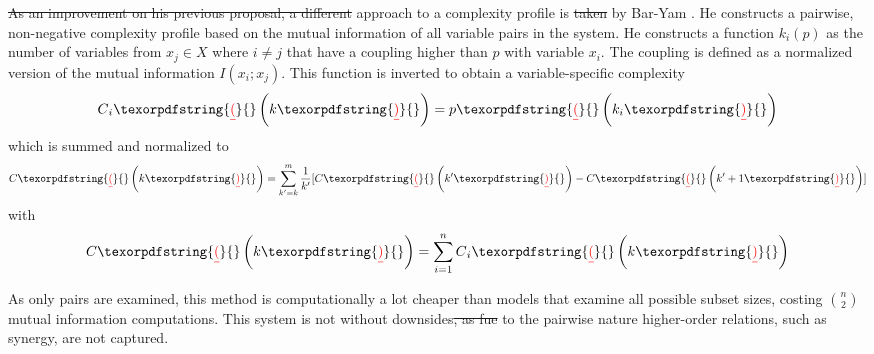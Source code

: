 \documentclass{article}
\providecommand{\DIFaddtex}[1]{{\protect\color{blue}\uwave{#1}}} %
\providecommand{\DIFdeltex}[1]{{\protect\color{red}\sout{#1}}}                      %
\providecommand{\DIFaddbegin}{} %
\providecommand{\DIFaddend}{} %
\providecommand{\DIFdelbegin}{} %
\providecommand{\DIFdelend}{} %
\providecommand{\DIFadd}[1]{\texorpdfstring{\DIFaddtex{#1}}{#1}} %
\providecommand{\DIFdel}[1]{\texorpdfstring{\DIFdeltex{#1}}{}} %
\begin{document}
\DIFdelend %
\DIFdelbegin \DIFdel{As an improvement on his previous proposal, a different }\DIFdelend \DIFaddbegin \DIFadd{An }\DIFaddend approach to a complexity profile is \DIFdelbegin \DIFdel{taken }\DIFdelend \DIFaddbegin \DIFadd{given }\DIFaddend by Bar-Yam \cite{bar2013computationally}.
He constructs a pairwise, non-negative complexity profile based on the mutual information of all variable pairs in the system.
He constructs a function $k_i (p)$ as the number of variables from $x_j \in X$ where $i \ne j$ that have a coupling higher than $p$ with variable $x_i$.
The coupling is defined as a normalized version of the mutual information \DIFdelbegin \DIFdel{$I(x_i;x_j)$}\DIFdelend \DIFaddbegin \DIFadd{$\mathrm{I}\left( x_i;x_j \right)$}\DIFaddend .
This function is inverted to obtain a variable-specific complexity
\begin{equation}
\overset{~}{C}_i\DIFdelbegin \DIFdel{(}\DIFdelend \DIFaddbegin \left( \DIFaddend k \DIFdelbegin \DIFdel{) }\DIFdelend \DIFaddbegin \right)  \DIFaddend = p \DIFdelbegin \DIFdel{(}\DIFdelend \DIFaddbegin \left( \DIFaddend k_i\DIFdelbegin \DIFdel{)
}\DIFdelend \DIFaddbegin \right)
\DIFaddend \end{equation}
%
which is summed and normalized to
%
\begin{equation}
C\DIFdelbegin \DIFdel{(}\DIFdelend \DIFaddbegin \left( \DIFaddend k \DIFdelbegin \DIFdel{) }\DIFdelend \DIFaddbegin \right)  \DIFaddend = \sum_{k^\prime= k}^m \frac{1}{k^\prime} [\overset{~}{C} \DIFdelbegin \DIFdel{(}\DIFdelend \DIFaddbegin \left( \DIFaddend k^\prime \DIFdelbegin \DIFdel{) }\DIFdelend \DIFaddbegin \right) \DIFaddend - \overset{~}{C} \DIFdelbegin \DIFdel{(}\DIFdelend \DIFaddbegin \left( \DIFaddend k^\prime + 1 \DIFdelbegin \DIFdel{)}\DIFdelend \DIFaddbegin \right) \DIFaddend ]
\end{equation}
%
with
%
\begin{equation}
\overset{~}{C} \DIFdelbegin \DIFdel{(}\DIFdelend \DIFaddbegin \left( \DIFaddend k \DIFdelbegin \DIFdel{) }\DIFdelend \DIFaddbegin \right)  \DIFaddend = \sum_{i=1}^n \overset{~}{C}_i \DIFdelbegin \DIFdel{(}\DIFdelend \DIFaddbegin \left( \DIFaddend k \DIFdelbegin \DIFdel{)
}\DIFdelend \DIFaddbegin \right) 
\DIFaddend \end{equation}

As only pairs are examined, this method is computationally a lot cheaper than models that examine all possible subset sizes, costing $\binom{n}{2}$ mutual information computations.
This system is not without downsides\DIFdelbegin \DIFdel{, as fue }\DIFdelend \DIFaddbegin \DIFadd{: due }\DIFaddend to the pairwise nature higher-order relations, such as synergy, are not captured.
\end{document}
